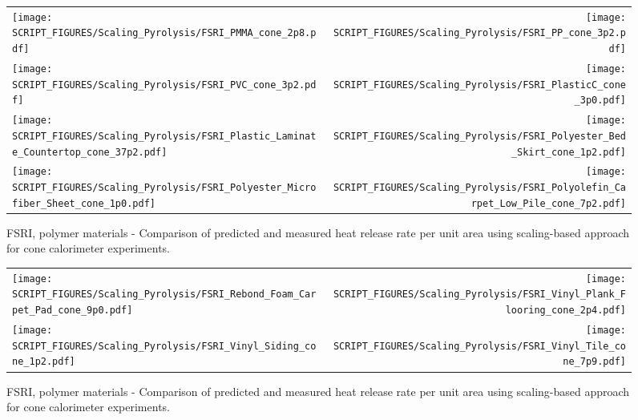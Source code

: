 \begin{figure}[p]
\begin{tabular*}{\textwidth}{l@{\extracolsep{\fill}}r}
\texttt{[image: SCRIPT\_FIGURES/Scaling\_Pyrolysis/FSRI\_PMMA\_cone\_2p8.pdf]} &
\texttt{[image: SCRIPT\_FIGURES/Scaling\_Pyrolysis/FSRI\_PP\_cone\_3p2.pdf]} \\
\texttt{[image: SCRIPT\_FIGURES/Scaling\_Pyrolysis/FSRI\_PVC\_cone\_3p2.pdf]} &
\texttt{[image: SCRIPT\_FIGURES/Scaling\_Pyrolysis/FSRI\_PlasticC\_cone\_3p0.pdf]} \\
\texttt{[image: SCRIPT\_FIGURES/Scaling\_Pyrolysis/FSRI\_Plastic\_Laminate\_Countertop\_cone\_37p2.pdf]} &
\texttt{[image: SCRIPT\_FIGURES/Scaling\_Pyrolysis/FSRI\_Polyester\_Bed\_Skirt\_cone\_1p2.pdf]} \\
\texttt{[image: SCRIPT\_FIGURES/Scaling\_Pyrolysis/FSRI\_Polyester\_Microfiber\_Sheet\_cone\_1p0.pdf]} &
\texttt{[image: SCRIPT\_FIGURES/Scaling\_Pyrolysis/FSRI\_Polyolefin\_Carpet\_Low\_Pile\_cone\_7p2.pdf]} \\
\end{tabular*}
\caption[HRRPUA of FSRI Materials using scaling model, polymer materials]
{FSRI, polymer materials - Comparison of predicted and measured heat release rate per unit area using scaling-based approach for cone calorimeter experiments.}
\label{FSRI_Materials_HRR_Polymers3}
\end{figure}

\begin{figure}[p]
\begin{tabular*}{\textwidth}{l@{\extracolsep{\fill}}r}
\texttt{[image: SCRIPT\_FIGURES/Scaling\_Pyrolysis/FSRI\_Rebond\_Foam\_Carpet\_Pad\_cone\_9p0.pdf]} &
\texttt{[image: SCRIPT\_FIGURES/Scaling\_Pyrolysis/FSRI\_Vinyl\_Plank\_Flooring\_cone\_2p4.pdf]} \\
\texttt{[image: SCRIPT\_FIGURES/Scaling\_Pyrolysis/FSRI\_Vinyl\_Siding\_cone\_1p2.pdf]} &
\texttt{[image: SCRIPT\_FIGURES/Scaling\_Pyrolysis/FSRI\_Vinyl\_Tile\_cone\_7p9.pdf]} \\
\end{tabular*}
\caption[HRRPUA of FSRI Materials using scaling model, polymer materials]
{FSRI, polymer materials - Comparison of predicted and measured heat release rate per unit area using scaling-based approach for cone calorimeter experiments.}
\label{FSRI_Materials_HRR_Polymers4}
\end{figure}

